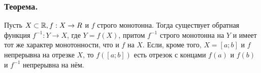 \subsubsection{Теорема.}
Пусть $X \subset \mathbb{R}, f:X \to R$ и $f$ строго монотонна.
Тогда существует обратная функция $f^{-1}:Y \to X$, где $Y=f(X)$, притом $f^{-1}$ строго монотонна на $Y$ и имеет тот же характер монотонности, что и $f$ на $X$.
Если, кроме того, $X=[a;b]$ и $f$ непрерывна на отрезке $X$, то $f([a; b])$ есть отрезок с концами $f(a)$ и $f(b)$ и $f^{-1}$ непрерывна на нём.

